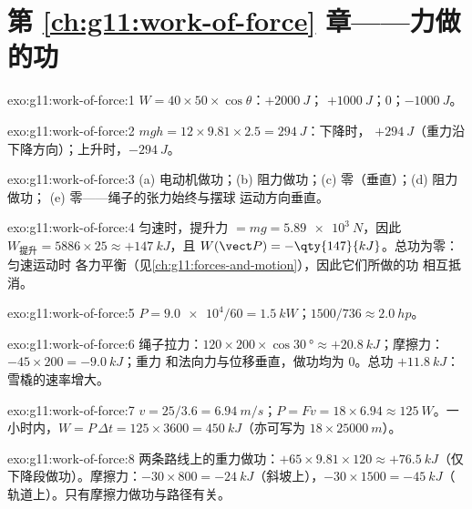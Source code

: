 \section*{第 \ref{ch:g11:work-of-force} 章——力做的功}

\begin{solution}{exo:g11:work-of-force:1}
$W = 40 \times 50 \times \cos\theta$：$+\qty{2000}{J}$；
$+\qty{1000}{J}$；$0$；$-\qty{1000}{J}$。
\end{solution}

\begin{solution}{exo:g11:work-of-force:2}
$mgh = 12 \times 9.81 \times 2.5 = \qty{294}{J}$：下降时，
$+\qty{294}{J}$（重力沿下降方向）；上升时，$-\qty{294}{J}$。
\end{solution}

\begin{solution}{exo:g11:work-of-force:3}
(a) 电动机做功；(b) 阻力做功；(c) 零（垂直）；(d) 阻力做功；
(e) 零——绳子的张力始终与摆球
运动方向垂直。
\end{solution}

\begin{solution}{exo:g11:work-of-force:4}
匀速时，提升力 $= mg = \qty{5.89e3}{N}$，因此
$W_{\text{提升}} = 5886 \times 25 \approx +\qty{147}{kJ}$，且
$W(\vect P) = -\qty{147}{kJ}$。总功为零：匀速运动时
各力平衡（见\cref{ch:g11:forces-and-motion}），因此它们所做的功
相互抵消。
\end{solution}

\begin{solution}{exo:g11:work-of-force:5}
$P = \num{9.0e4}/60 = \qty{1.5}{kW}$；$1500/736 \approx \qty{2.0}{hp}$。
\end{solution}

\begin{solution}{exo:g11:work-of-force:6}
绳子拉力：$120 \times 200 \times \cos\qty{30}{\degree} \approx
+\qty{20.8}{kJ}$；摩擦力：$-45 \times 200 = -\qty{9.0}{kJ}$；重力
和法向力与位移垂直，做功均为 $0$。总功 $+\qty{11.8}{kJ}$：
雪橇的速率增大。
\end{solution}

\begin{solution}{exo:g11:work-of-force:7}
$v = 25/3.6 = \qty{6.94}{m/s}$；$P = Fv = 18 \times 6.94 \approx
\qty{125}{W}$。一小时内，$W = P\,\Delta t = 125 \times 3600 =
\qty{450}{kJ}$（亦可写为 $18 \times \qty{25000}{m}$）。
\end{solution}

\begin{solution}{exo:g11:work-of-force:8}
两条路线上的重力做功：$+65 \times 9.81 \times 120 \approx
+\qty{76.5}{kJ}$（仅下降段做功）。摩擦力：$-30 \times 800 =
-\qty{24}{kJ}$（斜坡上），$-30 \times 1500 = -\qty{45}{kJ}$（
轨道上）。只有摩擦力做功与路径有关。
\end{solution}

